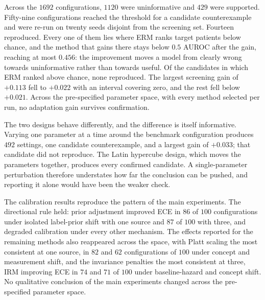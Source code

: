 
Across the $1692$ configurations, $1120$ were uninformative and $429$ were
supported. Fifty-nine configurations reached the threshold for a candidate
counterexample and were re-run on twenty seeds disjoint from the screening set.
Fourteen reproduced. Every one of them lies where ERM ranks target patients
below chance, and the method that gains there stays below $0.5$ AUROC after the
gain, reaching at most $0.456$: the improvement moves a model from clearly wrong
towards uninformative rather than towards useful. Of the candidates in which ERM
ranked above chance, none reproduced. The largest screening gain of $+0.113$
fell to $+0.022$ with an interval covering zero, and the rest fell below
$+0.021$. Across the pre-specified parameter space, with every method selected
per run, no adaptation gain survives confirmation.

The two designs behave differently, and the difference is itself informative.
Varying one parameter at a time around the benchmark configuration produces
$492$ settings, one candidate counterexample, and a largest gain of $+0.033$;
that candidate did not reproduce. The Latin hypercube design, which moves the
parameters together, produces every confirmed candidate. A single-parameter
perturbation therefore understates how far the conclusion can be pushed, and
reporting it alone would have been the weaker check.

The calibration results reproduce the pattern of the main experiments. The
directional rule held: prior adjustment improved ECE in $86$ of $100$
configurations under isolated label-prior shift with one source and $87$ of
$100$ with three, and degraded calibration under every other mechanism. The
effects reported for the remaining methods also reappeared across the space,
with Platt scaling the most consistent at one source, in $82$ and $62$
configurations of $100$ under concept and measurement shift, and the invariance
penalties the most consistent at three, IRM improving ECE in $74$ and $71$ of
$100$ under baseline-hazard and concept shift. No qualitative conclusion of the
main experiments changed across the pre-specified parameter space.
